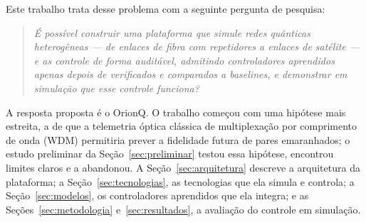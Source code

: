 \documentclass[12pt]{article}
\begin{document}
Este trabalho trata desse problema com a seguinte pergunta de pesquisa:

\begin{quote}
\textit{É possível construir uma plataforma que simule redes quânticas
heterogêneas --- de enlaces de fibra com repetidores a enlaces de satélite --- e
as controle de forma auditável, admitindo controladores aprendidos apenas depois
de verificados e comparados a baselines, e demonstrar em simulação que esse
controle funciona?}
\end{quote}

A resposta proposta é o OrionQ. O trabalho começou com uma hipótese mais
estreita, a de que a telemetria óptica clássica de multiplexação por comprimento
de onda (WDM) permitiria prever a fidelidade futura de pares emaranhados; o
estudo preliminar da Seção~\ref{sec:preliminar} testou essa hipótese, encontrou
limites claros e a abandonou. A Seção~\ref{sec:arquitetura} descreve a
arquitetura da plataforma; a Seção~\ref{sec:tecnologias}, as tecnologias que ela
simula e controla; a Seção~\ref{sec:modelos}, os controladores aprendidos que
ela integra; e as Seções~\ref{sec:metodologia} e~\ref{sec:resultados}, a
avaliação do controle em simulação.
\end{document}
